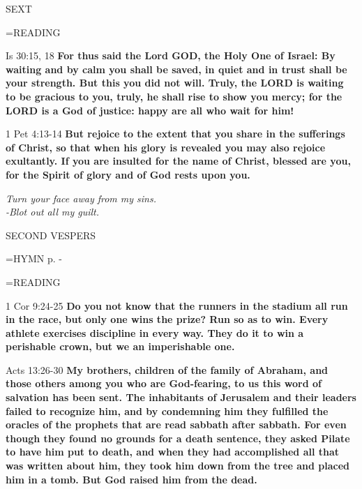 \begin{flushleft}\normalsize SEXT\\\end{flushleft}

\hangindent=\parindent \small READING
\begin{description}[labelindent=\parindent, leftmargin=*]
\item [Week 1-4:]   Is 30:15, 18 \textbf{  For thus said the Lord GOD, the Holy One of Israel: By waiting and by calm you shall be saved, in quiet and in trust shall be your strength. But this you did not will. Truly, the LORD is waiting to be gracious to you, truly, he shall rise to show you mercy; for the LORD is a God of justice: happy are all who wait for him!\\}
\item [Week 5:]   1 Pet 4:13-14 \textbf{  But rejoice to the extent that you share in the sufferings of Christ, so that when his glory is revealed you may also rejoice exultantly. If you are insulted for the name of Christ, blessed are you, for the Spirit of glory and of God rests upon you.\\}
\end{description}

\begin{center}
\textit{Turn your face away from my sins.\\
-Blot out all my guilt.}
\end{center}

\begin{flushleft}\normalsize SECOND VESPERS\\\end{flushleft}

\hangindent=\parindent \small{\uppercase{HYMN} p. \pageref{lent:firstHymn}-\pageref{lent:lastHymn}\\}

\hangindent=\parindent \small READING
\begin{description}[labelindent=\parindent, leftmargin=*]
\item [Week 1-4:]   1 Cor 9:24-25 \textbf{  Do you not know that the runners in the stadium all run in the race, but only one wins the prize? Run so as to win. Every athlete exercises discipline in every way. They do it to win a perishable crown, but we an imperishable one.\\}
\item [Week 5:]   Acts 13:26-30 \textbf{   My brothers, children of the family of Abraham, and those others among you who are God-fearing, to us this word of salvation has been sent. The inhabitants of Jerusalem and their leaders failed to recognize him, and by condemning him they fulfilled the oracles of the prophets that are read sabbath after sabbath. For even though they found no grounds for a death sentence, they asked Pilate to have him put to death, and when they had accomplished all that was written about him, they took him down from the tree and placed him in a tomb. But God raised him from the dead.\\}
\end{description}

